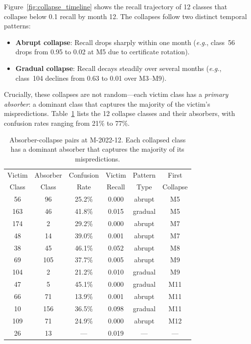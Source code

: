 \documentclass[journal]{IEEEtran}
\newcommand{\eg}{\textit{e.g.}}
\begin{document}
Figure~\ref{fig:collapse_timeline} shows the recall trajectory of 12 classes that collapse below 0.1 recall by month 12.
The collapses follow two distinct temporal patterns:
\begin{itemize}
  \item \textbf{Abrupt collapse}: Recall drops sharply within one month (\eg{}, class~56 drops from 0.95 to 0.02 at M5 due to certificate rotation).
  \item \textbf{Gradual collapse}: Recall decays steadily over several months (\eg{}, class~104 declines from 0.63 to 0.01 over M3--M9).
\end{itemize}

Crucially, these collapses are not random---each victim class has a \textit{primary absorber}: a dominant class that captures the majority of the victim's mispredictions.
Table~\ref{tab:absorber_pairs} lists the 12 collapse classes and their absorbers, with confusion rates ranging from 21\% to 77\%.

\begin{table}[t]
\centering
\caption{Absorber-collapse pairs at M-2022-12. Each collapsed class has a dominant absorber that captures the majority of its mispredictions.}
\label{tab:absorber_pairs}
\small
\begin{tabular}{@{}cccccc@{}}
\toprule
Victim & Absorber & Confusion & Victim & Pattern & First \\
Class  & Class    & Rate      & Recall & Type    & Collapse \\
\midrule
56  & 96  & 25.2\% & 0.000 & abrupt  & M5 \\
163 & 46  & 41.8\% & 0.015 & gradual & M5 \\
174 & 2   & 29.2\% & 0.000 & abrupt  & M7 \\
48  & 14  & 39.0\% & 0.001 & abrupt  & M7 \\
38  & 45  & 46.1\% & 0.052 & abrupt  & M8 \\
69  & 105 & 37.7\% & 0.005 & abrupt  & M9 \\
104 & 2   & 21.2\% & 0.010 & gradual & M9 \\
47  & 5   & 45.1\% & 0.000 & gradual & M11 \\
66  & 71  & 13.9\% & 0.001 & abrupt  & M11 \\
10  & 156 & 36.5\% & 0.098 & gradual & M11 \\
109 & 71  & 24.9\% & 0.000 & abrupt  & M12 \\
26  & 13  & ---    & 0.019 & ---     & --- \\
\bottomrule
\end{tabular}
\end{table}
\end{document}
